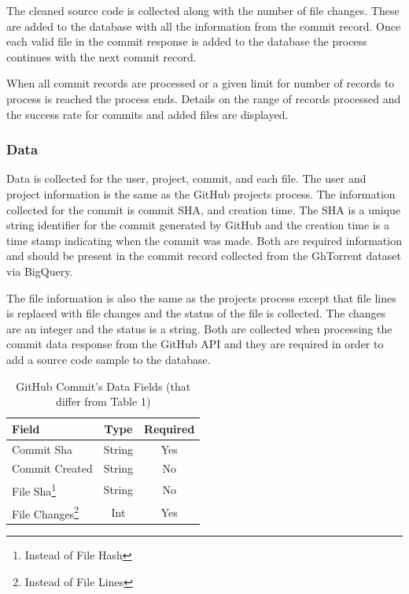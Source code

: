 \documentclass{article}
\begin{document}
The cleaned source code is collected along with the number of file changes. These are added to the database with all the information from the commit record.
Once each valid file in the commit response is added to the database the process continues with the next commit record.

When all commit records are processed or a given limit for number of records to process is reached the process ends. Details on the range of records processed and the success rate for commits and added files are displayed.

\subsubsection*{Data}
Data is collected for the user, project, commit, and each file. The user and project information is the same as the GitHub projects process. The information collected for the commit is commit SHA, and creation time. The SHA is a unique string identifier for the commit generated by GitHub and the creation time is a time stamp indicating when the commit was made. Both are required information and should be present in the commit record collected from the GhTorrent dataset via BigQuery.

The file information is also the same as the projects process except that file lines is replaced with file changes and the status of the file is collected. The changes are an integer and the status is a string. Both are collected when processing the commit data response from the GitHub API and they are required in order to add a source code sample to the database.

\begin{table}[t]
    \begin{center}
        \caption{GitHub Commit's Data Fields (that differ from Table 1)}
        \label{tab:commit_data}
        \begin{tabular}{|l | c | c |}
            \hline
            \textbf{Field} & \textbf{Type} & \textbf{Required}\\
            \hline
            Commit Sha & String & Yes\\
            Commit Created & String & No\\
            File Sha\footnote{Instead of File Hash} & String & No\\
            File Changes\footnote{Instead of File Lines} & Int & Yes\\
            \hline
        \end{tabular}
    \end{center}
\end{table}
\end{document}
